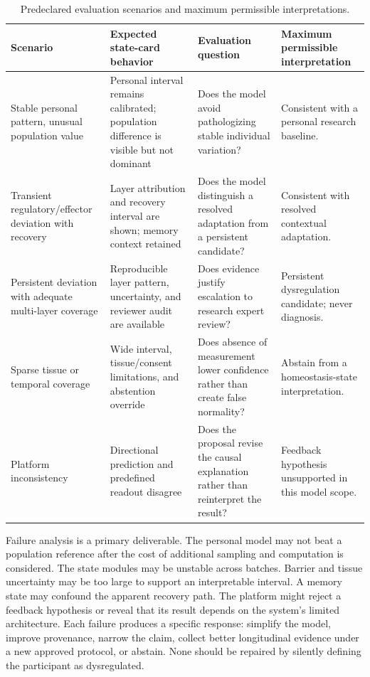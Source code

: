 \documentclass[conference]{IEEEtran}
\begin{document}
\begin{table}[t]
\caption{Predeclared evaluation scenarios and maximum permissible interpretations.}
\label{tab:scenarios}
\centering
\renewcommand{\arraystretch}{1.13}
\begin{tabular}{|p{}|p{}|p{}|p{}|}
\hline
\textbf{Scenario} & \textbf{Expected state-card behavior} & \textbf{Evaluation question} & \textbf{Maximum permissible interpretation} \\
\hline
Stable personal pattern, unusual population value & Personal interval remains calibrated; population difference is visible but not dominant & Does the model avoid pathologizing stable individual variation? & Consistent with a personal research baseline. \\
\hline
Transient regulatory/effector deviation with recovery & Layer attribution and recovery interval are shown; memory context retained & Does the model distinguish a resolved adaptation from a persistent candidate? & Consistent with resolved contextual adaptation. \\
\hline
Persistent deviation with adequate multi-layer coverage & Reproducible layer pattern, uncertainty, and reviewer audit are available & Does evidence justify escalation to research expert review? & Persistent dysregulation candidate; never diagnosis. \\
\hline
Sparse tissue or temporal coverage & Wide interval, tissue/consent limitations, and abstention override & Does absence of measurement lower confidence rather than create false normality? & Abstain from a homeostasis-state interpretation. \\
\hline
Platform inconsistency & Directional prediction and predefined readout disagree & Does the proposal revise the causal explanation rather than reinterpret the result? & Feedback hypothesis unsupported in this model scope. \\
\hline
\end{tabular}
\end{table}

Failure analysis is a primary deliverable. The personal model may not beat a population reference after the cost of additional sampling and computation is considered. The state modules may be unstable across batches. Barrier and tissue uncertainty may be too large to support an interpretable interval. A memory state may confound the apparent recovery path. The platform might reject a feedback hypothesis or reveal that its result depends on the system's limited architecture. Each failure produces a specific response: simplify the model, improve provenance, narrow the claim, collect better longitudinal evidence under a new approved protocol, or abstain. None should be repaired by silently defining the participant as dysregulated.
\end{document}
